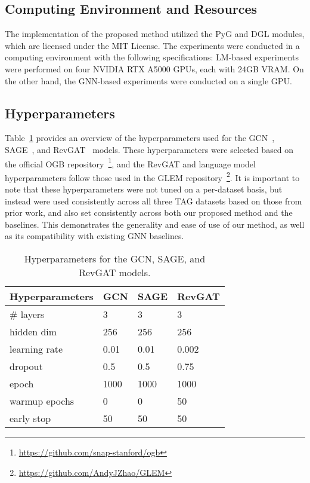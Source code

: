 \documentclass{article}
\begin{document}
\subsection{Computing Environment and Resources}
The implementation of the proposed method utilized the PyG and DGL modules, which are licensed under the MIT License. The experiments were conducted in a computing environment with the following specifications: LM-based experiments were performed on four NVIDIA RTX A5000 GPUs, each with 24GB VRAM. On the other hand, the GNN-based experiments were conducted on a single GPU.

\subsection{Hyperparameters}

Table~\ref{tab: hyperparam} provides an overview of the hyperparameters used for the GCN~\citep{kipf2016semi_gcn}, SAGE~\citep{hamilton2017inductive_sage}, and RevGAT~\citep{li2021training_revgat} models. These hyperparameters were selected based on the official OGB repository~\footnote{\url{https://github.com/snap-stanford/ogb}}, and the RevGAT and language model hyperparameters follow those used in the GLEM repository~\footnote{\url{https://github.com/AndyJZhao/GLEM}}. It is important to note that these hyperparameters were not tuned on a per-dataset basis, but instead were used consistently across all three TAG datasets based on those from prior work, and also set consistently across both our proposed method and the baselines. This demonstrates the generality and ease of use of our method, as well as its compatibility with existing GNN baselines.

\begin{table}[!ht]
    \centering
    \small
    \caption{Hyperparameters for the GCN, SAGE, and RevGAT models.}
    \label{tab: hyperparam}
\begin{tabular}{m{4cm}m{2cm}m{2cm}m{2cm}}
    \toprule
Hyperparameters & GCN& SAGE&RevGAT\\
\midrule
\# layers & 3 & 3 & 3\\
hidden dim & 256 & 256 & 256 \\
learning rate & 0.01 & 0.01 & 0.002\\
dropout & 0.5 & 0.5 & 0.75\\
epoch & 1000 & 1000 & 1000\\
warmup epochs & 0 & 0 & 50\\
early stop & 50 & 50 & 50\\
\bottomrule
\end{tabular}
\end{table}
\end{document}
